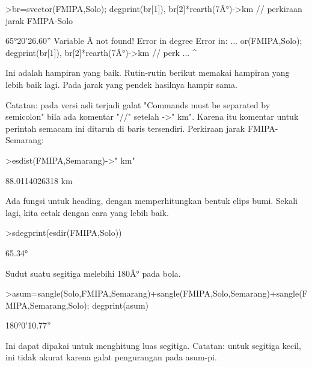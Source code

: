 \documentclass[a4paper,10pt]{article}
\begin{document}
\begin{eulernotebook}
\begin{eulercomment}
\begin{eulercomment}
\begin{eulercomment}
\begin{eulercomment}
\begin{eulercomment}
\begin{eulercomment}
\begin{eulercomment}
\begin{eulercomment}
\begin{eulercomment}
\begin{eulercomment}
\begin{eulercomment}
\begin{eulercomment}
\begin{eulercomment}
\begin{eulercomment}
\begin{eulercomment}
\begin{eulercomment}
\begin{eulercomment}
\begin{eulercomment}
\begin{eulerprompt}
>br=svector(FMIPA,Solo); degprint(br[1]), br[2]*rearth(7Â°)->km // perkiraan jarak FMIPA-Solo
\end{eulerprompt}
\begin{euleroutput}
  65°20'26.60''
  Variable Â not found!
  Error in degree
  Error in:
  ... or(FMIPA,Solo); degprint(br[1]), br[2]*rearth(7Â°)->km // perk ...
                                                       ^
\end{euleroutput}
\begin{eulercomment}
Ini adalah hampiran yang baik. Rutin-rutin berikut memakai hampiran yang lebih baik lagi.
Pada jarak yang pendek hasilnya hampir sama.

Catatan: pada versi asli terjadi galat "Commands must be separated by semicolon" bila ada
komentar "//" setelah -\textgreater{}" km". Karena itu komentar untuk perintah semacam ini ditaruh di baris
tersendiri.
Perkiraan jarak FMIPA-Semarang:
\end{eulercomment}
\begin{eulerprompt}
>esdist(FMIPA,Semarang)->" km"
\end{eulerprompt}
\begin{euleroutput}
  88.0114026318 km
\end{euleroutput}
\begin{eulercomment}
Ada fungsi untuk heading, dengan memperhitungkan bentuk elips bumi. Sekali lagi, kita cetak
dengan cara yang lebih baik.
\end{eulercomment}
\begin{eulerprompt}
>sdegprint(esdir(FMIPA,Solo))
\end{eulerprompt}
\begin{euleroutput}
       65.34°
\end{euleroutput}
\begin{eulercomment}
Sudut suatu segitiga melebihi 180Â° pada bola.
\end{eulercomment}
\begin{eulerprompt}
>asum=sangle(Solo,FMIPA,Semarang)+sangle(FMIPA,Solo,Semarang)+sangle(FMIPA,Semarang,Solo); degprint(asum)
\end{eulerprompt}
\begin{euleroutput}
  180°0'10.77''
\end{euleroutput}
\begin{eulercomment}
Ini dapat dipakai untuk menghitung luas segitiga. Catatan: untuk segitiga kecil, ini tidak
akurat karena galat pengurangan pada asum-pi.

\end{eulercomment}
\end{eulercomment}
\end{eulercomment}
\end{eulercomment}
\end{eulercomment}
\end{eulercomment}
\end{eulercomment}
\end{eulercomment}
\end{eulercomment}
\end{eulercomment}
\end{eulercomment}
\end{eulercomment}
\end{eulercomment}
\end{eulercomment}
\end{eulercomment}
\end{eulercomment}
\end{eulercomment}
\end{eulercomment}
\end{eulercomment}
\end{eulernotebook}
\end{document}
